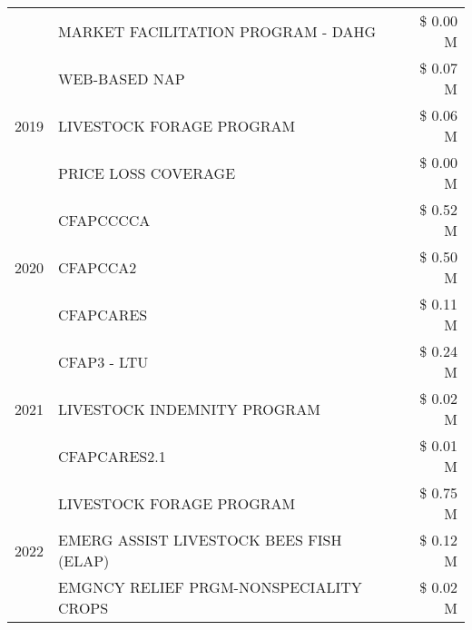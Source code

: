 \begin{tabular}{llr}
 & MARKET FACILITATION PROGRAM - DAHG & \$ 0.00 M \\
\cline{1-3}
\multirow[t]{3}{*}{2019} & WEB-BASED NAP & \$ 0.07 M \\
 & LIVESTOCK FORAGE PROGRAM & \$ 0.06 M \\
 & PRICE LOSS COVERAGE & \$ 0.00 M \\
\cline{1-3}
\multirow[t]{3}{*}{2020} & CFAPCCCCA & \$ 0.52 M \\
 & CFAPCCA2 & \$ 0.50 M \\
 & CFAPCARES & \$ 0.11 M \\
\cline{1-3}
\multirow[t]{3}{*}{2021} & CFAP3 - LTU & \$ 0.24 M \\
 & LIVESTOCK INDEMNITY PROGRAM & \$ 0.02 M \\
 & CFAPCARES2.1 & \$ 0.01 M \\
\cline{1-3}
\multirow[t]{3}{*}{2022} & LIVESTOCK FORAGE PROGRAM & \$ 0.75 M \\
 & EMERG ASSIST LIVESTOCK BEES FISH (ELAP) & \$ 0.12 M \\
 & EMGNCY RELIEF PRGM-NONSPECIALITY CROPS & \$ 0.02 M \\
\cline{1-3}
\bottomrule
\end{tabular}
